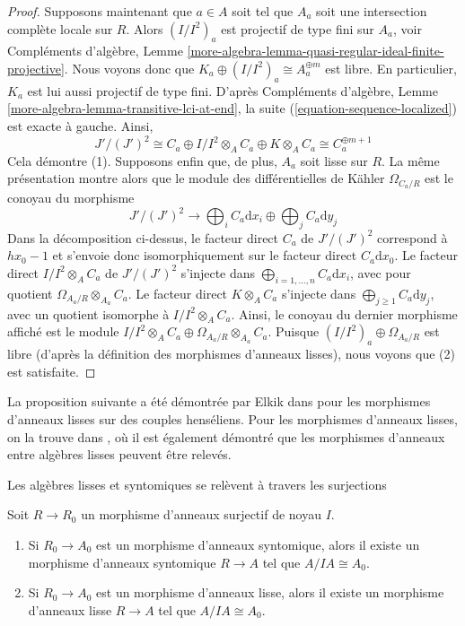 \begin{proof}
\medskip\noindent
Supposons maintenant que $a \in A$ soit tel que $A_a$ soit une intersection
complète locale sur $R$. Alors $(I/I^2)_a$ est projectif de type fini sur $A_a$,
voir
Compléments d'algèbre, Lemme
\ref{more-algebra-lemma-quasi-regular-ideal-finite-projective}.
Nous voyons donc que $K_a \oplus (I/I^2)_a \cong A_a^{\oplus m}$ est libre.
En particulier, $K_a$ est lui aussi projectif de type fini.
D'après Compléments d'algèbre, Lemme \ref{more-algebra-lemma-transitive-lci-at-end},
la suite (\ref{equation-sequence-localized}) est exacte à gauche. Ainsi,
$$
J'/(J')^2 \cong
C_a \oplus I/I^2 \otimes_A C_a \oplus K \otimes_A C_a \cong
C_a^{\oplus m + 1}
$$
Cela démontre (1). Supposons enfin que, de plus, $A_a$ soit lisse sur $R$.
La même présentation montre alors que le module des différentielles de Kähler
$\Omega_{C_a/R}$ est le conoyau du morphisme
$$
J'/(J')^2 \longrightarrow
\bigoplus\nolimits_i C_a\text{d}x_i \oplus \bigoplus\nolimits_j C_a\text{d}y_j
$$
Dans la décomposition ci-dessus, le facteur direct $C_a$ de $J'/(J')^2$
correspond à $hx_0 - 1$ et s'envoie donc isomorphiquement sur le facteur direct
$C_a\text{d}x_0$. Le facteur direct $I/I^2 \otimes_A C_a$ de $J'/(J')^2$
s'injecte dans $\bigoplus_{i = 1, \ldots, n} C_a\text{d}x_i$, avec pour quotient
$\Omega_{A_a/R} \otimes_{A_a} C_a$. Le facteur direct $K \otimes_A C_a$
s'injecte dans $\bigoplus_{j \geq 1} C_a\text{d}y_j$, avec un quotient isomorphe
à $I/I^2 \otimes_A C_a$. Ainsi, le conoyau du dernier morphisme affiché est le
module
$I/I^2 \otimes_A C_a \oplus \Omega_{A_a/R} \otimes_{A_a} C_a$.
Puisque $(I/I^2)_a \oplus \Omega_{A_a/R}$ est libre (d'après la définition des
morphismes d'anneaux lisses), nous voyons que (2) est satisfaite.
\end{proof}

\noindent
La proposition suivante a été démontrée par Elkik dans \cite{Elkik} pour les
morphismes d'anneaux lisses sur des couples henséliens. Pour les morphismes
d'anneaux lisses, on la trouve dans \cite{Arabia}, où il est également démontré
que les morphismes d'anneaux entre algèbres lisses peuvent être relevés.

\begin{proposition}
\label{proposition-lift-smooth}
\begin{slogan}
Les algèbres lisses et syntomiques se relèvent à travers les surjections
\end{slogan}
Soit $R \to R_0$ un morphisme d'anneaux surjectif de noyau $I$.
\begin{enumerate}
\item Si $R_0 \to A_0$ est un morphisme d'anneaux syntomique, alors il existe
un morphisme d'anneaux syntomique $R \to A$ tel que $A/IA \cong A_0$.
\item Si $R_0 \to A_0$ est un morphisme d'anneaux lisse, alors il existe un
morphisme d'anneaux lisse $R \to A$ tel que $A/IA \cong A_0$.
\end{enumerate}
\end{proposition}

